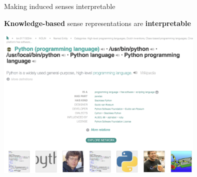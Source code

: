 \documentclass{beamer}
\begin{document}
\begin{frame}{ Making induced senses interpretable }

\vspace{-1em}

\textbf{Knowledge-based} sense representations are \alert{\textbf{interpretable}}
	\begin{center}
	\includegraphics[width=0.75\textwidth]{babelnet}
	\end{center}


\end{frame}
\end{document}
